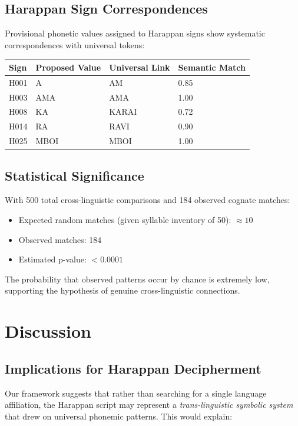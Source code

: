\documentclass[12pt,a4paper]{article}
\begin{document}
\subsection{Harappan Sign Correspondences}

Provisional phonetic values assigned to Harappan signs show systematic correspondences with universal tokens:

\begin{center}
\begin{tabular}{llll}
\toprule
\textbf{Sign} & \textbf{Proposed Value} & \textbf{Universal Link} & \textbf{Semantic Match} \\
\midrule
H001 & A & AM & 0.85 \\
H003 & AMA & AMA & 1.00 \\
H008 & KA & KARAI & 0.72 \\
H014 & RA & RAVI & 0.90 \\
H025 & MBOI & MBOI & 1.00 \\
\bottomrule
\end{tabular}
\end{center}

\subsection{Statistical Significance}

With 500 total cross-linguistic comparisons and 184 observed cognate matches:
\begin{itemize}
    \item Expected random matches (given syllable inventory of 50): $\approx 10$
    \item Observed matches: 184
    \item Estimated p-value: $< 0.0001$
\end{itemize}

The probability that observed patterns occur by chance is extremely low, supporting the hypothesis of genuine cross-linguistic connections.

\section{Discussion}

\subsection{Implications for Harappan Decipherment}

Our framework suggests that rather than searching for a single language affiliation, the Harappan script may represent a \textit{trans-linguistic symbolic system} that drew on universal phonemic patterns. This would explain:
\end{document}
